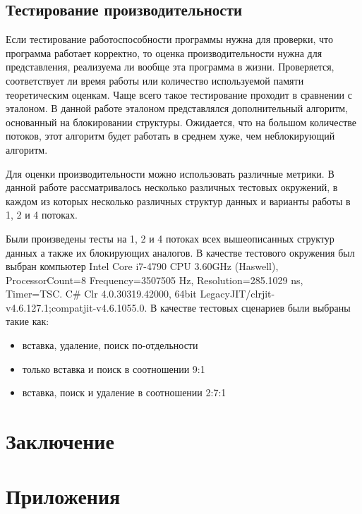 \documentclass[12pt]{article}
\begin{document}
{				\subsection{Тестирование производительности}
					\par Если тестирование работоспособности программы нужна для проверки, что программа работает корректно, то оценка производительности нужна для представления, реализуема ли вообще эта программа в жизни. Проверяется, соответствует ли время работы или количество используемой памяти теоретическим оценкам. Чаще всего такое тестирование проходит в сравнении с эталоном. В данной работе эталоном представлялся дополнительный алгоритм, основанный на блокировании структуры. Ожидается, что на большом количестве потоков, этот алгоритм будет работать в среднем хуже, чем неблокирующий алгоритм.
					\par Для оценки производительности можно использовать различные метрики. В данной работе рассматривалось несколько различных тестовых окружений, в каждом из которых несколько различных структур данных и варианты работы в 1, 2 и 4 потоках. 
					\par Были произведены тесты на 1, 2 и 4 потоках всех вышеописанных структур данных а также их блокирующих аналогов. В качестве тестового окружения был выбран компьютер Intel Core i7-4790 CPU 3.60GHz (Haswell), ProcessorCount=8 Frequency=3507505 Hz, Resolution=285.1029 ns, Timer=TSC. C\# Clr 4.0.30319.42000, 64bit LegacyJIT/clrjit-v4.6.127.1;compatjit-v4.6.1055.0.
					В качестве тестовых сценариев были выбраны такие как: 
					\begin{itemize}
						\item вставка, удаление, поиск по-отдельности
						\item только вставка и поиск в соотношении 9:1
						\item вставка, поиск и удаление в соотношении 2:7:1			
					\end{itemize}
				
				
		\newpage
		
		\section{Заключение}
		
		\newpage
			
			  
		
		\newpage
		
		\section{Приложения}
	}
	
\end{document}
